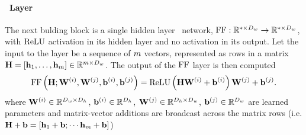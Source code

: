   \paragraph{\FeedForward~Layer} The next bulding block is a single hidden layer \feedforward~network, $\operatorname{FF} : \mathbb{R}^{*\times D_{w}} \rightarrow \mathbb{R}^{*\times D_{w}}$, with $\operatorname{ReLU}$ activation in its hidden layer and
  no activation in its output.
  Let the input to the layer be a sequence of $m$ vectors, represented 
  as rows in a matrix $\mathbf{H} =\left[\mathbf{h}_1,\ldots,\mathbf{h}_{m} \right]\in \mathbb{R}^{m \times {D_{\ensuremath{w}}}}$.
The output of the $\operatorname{FF}$ layer is then computed
\[\operatorname{FF}\left(\mathbf{H};\mathbf{W}^{(i)},\mathbf{W}^{(j)},\mathbf{b}^{(i)},\mathbf{b}^{(j)}\right) = 
\operatorname{ReLU}\left(\mathbf{H}\mathbf{W}^{(i)} + \mathbf{b}^{(i)}\right)\mathbf{W}^{(j)} + \mathbf{b}^{(j)}.     \]
where $\mathbf{W}^{(i)} \in \mathbb{R}^{D_{w} \times D_{h}}$, $\mathbf{b}^{(i)} \in \mathbb{R}^{D_{h}}$,
$\mathbf{W}^{(j)} \in \mathbb{R}^{D_{h} \times D_{w}}$, $\mathbf{b}^{(j)} \in \mathbb{R}^{D_{w}}$ are learned parameters and 
 matrix-vector additions  are broadcast across  the matrix rows
 (i.e. $\mathbf{H} + \mathbf{b} = \left[\mathbf{h}_1 + \mathbf{b};\cdots \mathbf{h}_{m} + \mathbf{b}\right]$)

